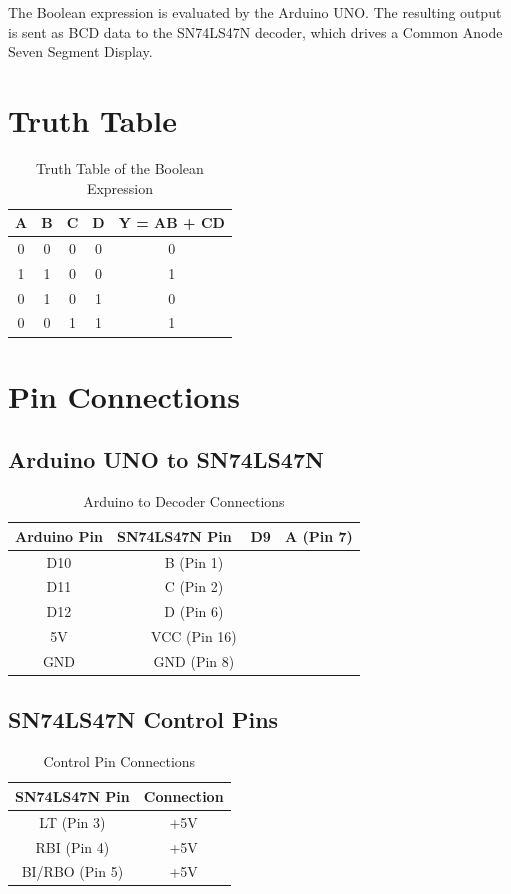 \documentclass[12pt,a4paper]{article}
\begin{document}
The Boolean expression is evaluated by the Arduino UNO. The resulting output is sent as BCD data to the SN74LS47N decoder, which drives a Common Anode Seven Segment Display.

\section*{Truth Table}

\begin{table}[H]
\centering
\caption{Truth Table of the Boolean Expression}
\begin{tabular}{|c|c|c|c|c|}
\hline
A & B & C & D & Y = AB + CD \\
\hline
0 & 0 & 0 & 0 & 0 \\
\hline
1 & 1 & 0 & 0 & 1 \\
\hline
0 & 1 & 0 & 1 & 0 \\
\hline
0 & 0 & 1 & 1 & 1 \\
\hline
\end{tabular}
\end{table}

\section*{Pin Connections}

\subsection*{Arduino UNO to SN74LS47N}

\begin{table}[H]
\centering
\caption{Arduino to Decoder Connections}
\begin{tabular}{|c|c|}
\hline
Arduino Pin & SN74LS47N Pin \
\hline
D9 & A (Pin 7) \\
\hline
D10 & B (Pin 1) \\
\hline
D11 & C (Pin 2) \\
\hline
D12 & D (Pin 6) \\
\hline
5V & VCC (Pin 16) \\
\hline
GND & GND (Pin 8) \\
\hline
\end{tabular}
\end{table}

\subsection*{SN74LS47N Control Pins}

\begin{table}[H]
\centering
\caption{Control Pin Connections}
\begin{tabular}{|c|c|}
\hline
SN74LS47N Pin & Connection \\
\hline
LT (Pin 3) & +5V \\
\hline
RBI (Pin 4) & +5V \\
\hline
BI/RBO (Pin 5) & +5V \\
\hline
\end{tabular}
\end{table}
\end{document}
